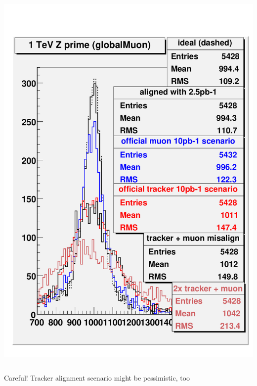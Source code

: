 \documentclass[compress]{beamer}
\begin{document}
\begin{frame}
\begin{columns}
\includegraphics[width=\linewidth]{trackercompare_zprime_1000.pdf}
\end{columns}

\vspace{0.25 cm}
Careful!  Tracker alignment scenario might be pessimistic, too
\end{frame}
\end{document}
